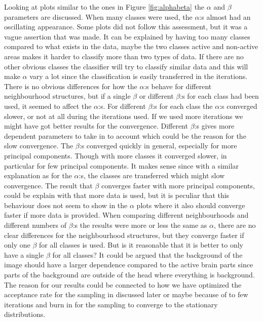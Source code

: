 \documentclass[a4paper,english]{article}
\begin{document}
Looking at plots similar to the ones in Figure \ref{fig:alphabeta} the $\alpha$ and $\beta$ parameters are discussed.
When many classes were used, the $\alpha$:s almost had an oscillating appearance. Some plots did not follow this assessment, but it was a vague assertion that was made.
It can be explained by having too many classes compared to what exists in the data, maybe the two classes active and non-active areas makes it harder to classify more than two types of data.
If there are no other obvious classes the classifier will try to classify similar data and this will make $\alpha$ vary a lot since the classification is easily transferred in the iterations. There is no obvious differences for how the $\alpha$:s behave for different neighbourhood structures, but if a single $\beta$ or different $\beta$:s for each class had been used, it seemed to affect the $\alpha$:s.
For different $\beta$:s for each class the $\alpha$:s converged slower, or not at all during the iterations used.
If we used more iterations we might have got better results for the convergence.
Different $\beta$:s gives more dependent parameters to take in to account which could be the reason for the slow convergence.
The $\beta$:s converged quickly in general, especially for more principal components.
Though with more classes it converged slower, in particular for few principal components.
It makes sense since with a similar explanation as for the $\alpha$:s, the classes are transferred which might slow convergence.
The result that $\beta$ converges faster with more principal components, could be explain with that more data is used, but it is peculiar that this behaviour does not seem to show in the $\alpha$ plots where it also should converge faster if more data is provided.
When comparing different neighbourhoods and different numbers of $\beta$:s the results were more or less the same as $\alpha$, there are no clear differences for the neighbourhood structures, but they converge faster if only one $\beta$ for all classes is used.
But is it reasonable that it is better to only have a single $\beta$ for all classes?
It could be argued that the background of the image should have a larger dependence compared to the active brain parts since parts of the background are outside of the head where everything is background.
The reason for our results could be connected to how we have optimized the acceptance rate for the sampling in discussed later or maybe because of to few iterations and burn in for the sampling to converge to the stationary distributions.
\end{document}
